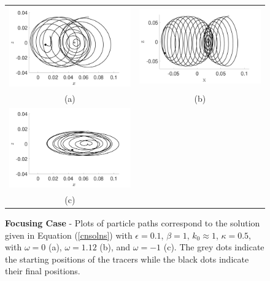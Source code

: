 \documentclass{JFM_Style/jfm}
\begin{document}
\begin{figure}
\centering
\begin{tabular}{cc}
\includegraphics[width=.48\textwidth]{track_ep_pt1_tf_1_w_0_kap_pt5_foc} & \includegraphics[width=.48\textwidth]{track_ep_pt1_tf_1_w_1_kap_pt5_foc} \\
(a) & (b) \\
\includegraphics[width=.48\textwidth]{track_ep_pt1_tf_1_w_n1_kap_pt5_foc} & \\
(c) &
\end{tabular}
\caption{\small {\bf Focusing Case} - Plots of particle paths correspond to the solution given in Equation (\ref{cnsolns}) with $\epsilon=0.1$, $\beta=1$, $k_{0}\approx 1$, $\kappa=0.5$, with $\omega=0$ (a), $\omega=1.12$ (b), and $\omega=-1$ (c). The grey dots indicate the starting positions of the tracers while the black dots indicate their final positions.}
\label{fig:foc_kap_pt5}
\end{figure}
\end{document}
